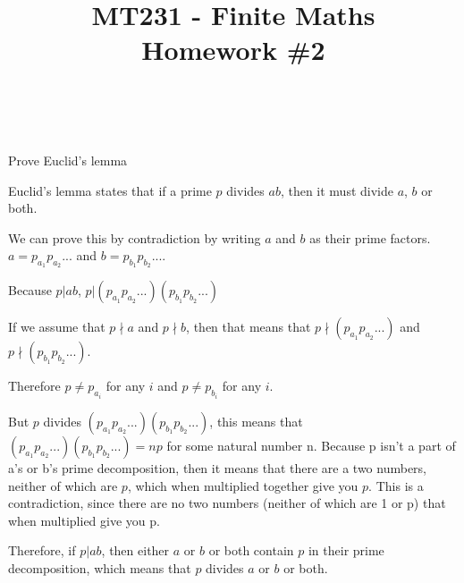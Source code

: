 \documentclass[12pt]{article} %
\title{
    \vspace{2in}
        \textmd{\textbf{MT231 - Finite Maths}}\\
    \vspace{1in}
    \textmd{\textbf{Homework \#2}}\\
    \vspace{1in}
}
\author{
    \hmwkAuthorName\\
    \hmwkStudentnum
}
\date{}
\begin{document}
\maketitle

\pagebreak

\begin{homeworkProblem}

    \begin{grayBoxed}
        Prove Euclid's lemma
    \end{grayBoxed}

    Euclid's lemma states that if a prime $p$ divides $ab$, then it must divide $a$, $b$ or both.

    We can prove this by contradiction by writing $a$ and $b$ as their prime factors. $a = p_{a_1} p_{a_2} ...$ and $b = p_{b_1} p_{b_2} ...$.

    Because $p|ab$, $p|(p_{a_1} p_{a_2} ...) (p_{b_1} p_{b_2} ...)$

    If we assume that $p\nmid a$ and $p\nmid b$, then that means that $p\nmid(p_{a_1} p_{a_2} ...)$ and $p\nmid(p_{b_1} p_{b_2} ...)$.

    Therefore $p \not = p_{a_i}$ for any $i$ and  $p \not = p_{b_i}$ for any $i$.

    But $p$ divides $(p_{a_1} p_{a_2} ...) (p_{b_1} p_{b_2} ...)$, this means that $(p_{a_1} p_{a_2} ...) (p_{b_1} p_{b_2} ...) = np$ for some natural number n. Because p isn't a part of
    a's or b's prime decomposition, then it means that there are a two numbers, neither of which are $p$, which when multiplied together give you $p$. This is a contradiction, since there are no
    two numbers (neither of which are 1 or p) that when multiplied give you p.

    Therefore, if $p|ab$, then either $a$ or $b$ or both contain $p$ in their prime decomposition, which means that $p$ divides $a$ or $b$ or both.

\end{homeworkProblem}

\pagebreak

\begin{homeworkProblem}

\end{homeworkProblem}

\pagebreak
\end{document}
